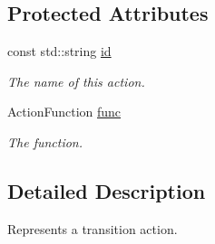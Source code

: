 \subsection*{Protected Attributes}
\begin{DoxyCompactItemize}
\item 
\hypertarget{classfsml_1_1Action_ab5da63bc94cdd0b4110c87fd3e4ee271}{const std\-::string \hyperlink{classfsml_1_1Action_ab5da63bc94cdd0b4110c87fd3e4ee271}{id}}\label{classfsml_1_1Action_ab5da63bc94cdd0b4110c87fd3e4ee271}

\begin{DoxyCompactList}\small\item\em The name of this action. \end{DoxyCompactList}\item 
\hypertarget{classfsml_1_1Action_a40fbbd85f83fd1c0b5260584a24469ee}{Action\-Function \hyperlink{classfsml_1_1Action_a40fbbd85f83fd1c0b5260584a24469ee}{func}}\label{classfsml_1_1Action_a40fbbd85f83fd1c0b5260584a24469ee}

\begin{DoxyCompactList}\small\item\em The function. \end{DoxyCompactList}\end{DoxyCompactItemize}


\subsection{Detailed Description}
Represents a transition action. 



